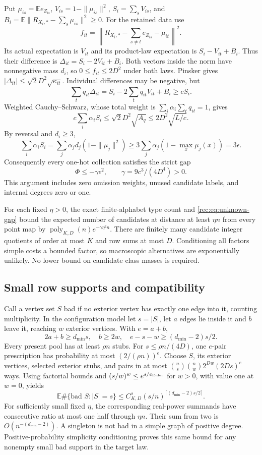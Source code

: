 \documentclass[11pt]{article}
\theoremstyle{definition}
\theoremstyle{remark}
\newcommand{\E}{\mathbb E}
\newcommand{\1}{\mathbf 1}
\begin{document}
Put $\mu_{is}=\E e_{Z_{is}}$, $V_{is}=1-\|\mu_{is}\|^2$,
$S_i=\sum_sV_{is}$, and
$B_i=\E\|R_{X_i,*}-\sum_s\mu_{is}\|^2\ge0$.
For the retained data use
\[
 f_{it}=\left\|R_{X_i,*}-\sum_{s\ne t}e_{Z_{is}}-\mu_{it}\right\|^2.
\]
Its actual expectation is $V_{it}$ and its product-law expectation is
$S_i-V_{it}+B_i$. Thus their difference is
$\Delta_{it}=S_i-2V_{it}+B_i$.
Both vectors inside the norm have nonnegative mass $d_i$, so
$0\le f_{it}\le2D^2$ under both laws. Pinsker gives
$|\Delta_{it}|\le\sqrt2D^2\sqrt{\kappa_{it}}$.
Individual differences may be negative, but
\[
 \sum_tq_{it}\Delta_{it}
 =S_i-2\sum_tq_{it}V_{it}+B_i\ge cS_i.
\]
Weighted Cauchy--Schwarz, whose total weight is
$\sum_i\alpha_i\sum_tq_{it}=1$, gives
\[
 c\sum_i\alpha_iS_i
 \le\sqrt2D^2\sqrt{A_q}\le2D^2\sqrt{L/c}.
\]
By reversal and $d_i\ge3$,
\[
 \sum_i\alpha_iS_i
 =\sum_j\alpha_jd_j(1-\|\mu_j\|^2)
 \ge3\sum_j\alpha_j(1-\max_x\mu_j(x))=3\epsilon.
\]
Consequently every one-hot collection satisfies the strict gap
\begin{equation}\label{rec:eq:unknown-gap}
 \Phi\le-\gamma\epsilon^2,\qquad \gamma=9c^3/(4D^4)>0.
\end{equation}
This argument includes zero omission weights, unused candidate labels,
and internal degrees zero or one.

For each fixed $\eta>0$, the exact finite-alphabet type count and
\eqref{rec:eq:unknown-gap} bound the expected number of candidates at
distance at least $\eta n$ from every point map by
$\operatorname{poly}_{K,D}(n)e^{-\gamma\eta^2n}$.
There are finitely many candidate integer quotients of order at most
$K$ and row sums at most $D$. Conditioning all factors simple costs a
bounded factor, so macroscopic alternatives are exponentially unlikely.
No lower bound on candidate class masses is required.

\subsection{Small row supports and compatibility}
Call a vertex set $S$ bad if no exterior vertex has exactly one edge
into it, counting multiplicity. In the configuration model let
$s=|S|$, let $a$ edges lie inside it and $b$ leave it, reaching
$w$ exterior vertices. With $e=a+b$,
\[
 2a+b\ge d_{\min}s,\quad b\ge2w,\quad
 e-s-w\ge(d_{\min}-2)s/2.
\]
Every present pool has at least $\rho n$ stubs. For
$s\le\rho n/(4D)$, one $e$-pair prescription has probability at most
$(2/(\rho n))^e$. Choose $S$, its exterior vertices, selected exterior
stubs, and pairs in at most
$\binom ns\binom nw2^{Dw}(2Ds)^e$ ways.
Using factorial bounds and $(s/w)^w\le e^{s/e_{\rm Euler}}$ for
$w>0$, with value one at $w=0$, yields
\begin{equation}\label{rec:eq:unknown-support}
 \E\#\{\text{bad }S:|S|=s\}
 \le C_{K,D}^s(s/n)^{\lceil(d_{\min}-2)s/2\rceil}.
\end{equation}
For sufficiently small fixed $\eta$, the corresponding real-power
summands have consecutive ratio at most one half through $\eta n$.
Their sum from two is $O(n^{-(d_{\min}-2)})$.
A singleton is not bad in a simple graph of positive degree.
Positive-probability simplicity conditioning proves this same bound
for any nonempty small bad support in the target law.
\end{document}
